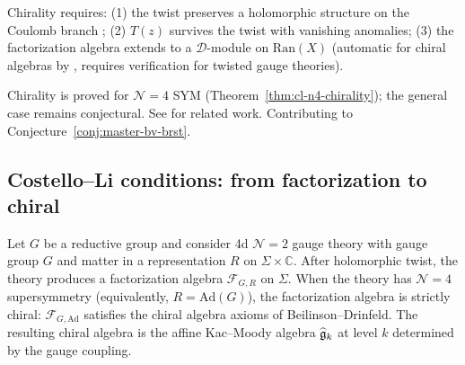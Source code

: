 \begin{remark}[Evidence]
Chirality requires: (1) the twist preserves a holomorphic structure on the Coulomb branch \cite{Gai19}; (2) $T(z)$ survives the twist with vanishing anomalies; (3) the factorization algebra extends to a $\mathcal{D}$-module on $\mathrm{Ran}(X)$ (automatic for chiral algebras by , requires verification for twisted gauge theories).
\end{remark}

\begin{remark}[Scope]
Chirality is proved for $\mathcal{N}=4$ SYM (Theorem~\ref{thm:cl-n4-chirality}); the general case remains conjectural.  See \cite{CDG20,GKW24,Zeng23} for related work.  Contributing to Conjecture~\ref{conj:master-bv-brst}.
\end{remark}

\subsection{Costello--Li conditions: from factorization to chiral}

\begin{theorem}[CL chirality for \texorpdfstring{$\mathcal{N}=4$}{N=4}; \ClaimStatusProvedElsewhere]
\label{thm:cl-n4-chirality}
\cite{CL16}
Let $G$ be a reductive group and consider 4d $\mathcal{N}=2$ gauge theory
with gauge group $G$ and matter in a representation $R$ on $\Sigma \times \mathbb{C}$.
After holomorphic twist, the theory produces a factorization algebra
$\mathcal{F}_{G,R}$ on $\Sigma$.  When the theory has $\mathcal{N}=4$
supersymmetry (equivalently, $R = \mathrm{Ad}(G)$), the factorization algebra
is strictly chiral: $\mathcal{F}_{G,\mathrm{Ad}}$ satisfies the chiral algebra
axioms of Beilinson--Drinfeld.  The resulting chiral algebra is the affine
Kac--Moody algebra $\widehat{\mathfrak{g}}_k$ at level $k$ determined by the gauge coupling.
\end{theorem}

